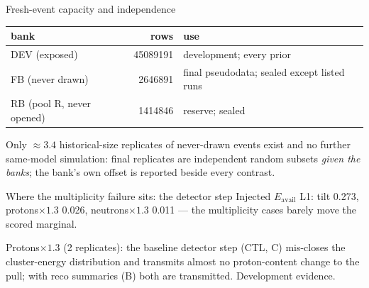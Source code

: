 \documentclass[aspectratio=169,10pt]{beamer}
\def\evidencetext{}
\begin{document}
\gdef\evidencetext{\texttt{banks/BANK\_MANIFEST.json}; \texttt{CAPACITY-20260925.md}}
\begin{frame}{Fresh-event capacity and independence}
{\small
\begin{tabular}{lrl}
\toprule
bank & rows & use \\
\midrule
DEV (exposed) & 45089191 & development; every prior \\
FB (never drawn) & 2646891 & final pseudodata; sealed except listed runs \\
RB (pool R, never opened) & 1414846 & reserve; sealed \\
\bottomrule
\end{tabular}}

\vspace{0.3cm}\small Only $\approx 3.4$ historical-size replicates of never-drawn events exist and no further
same-model simulation: final replicates are independent random subsets \emph{given the banks}; the bank's own
offset is reported beside every contrast.
\end{frame}

\gdef\evidencetext{\texttt{results/predecessor\_posthoc/}; \texttt{DIAGNOSTICS-20260925.md}}
\begin{frame}{Where the multiplicity failure sits: the detector step}
\small Injected $E_\mathrm{avail}$ L1: tilt 0.273, protons$\times1.3$ 0.026, neutrons$\times1.3$ 0.011 --- the multiplicity cases barely move the scored marginal.\par{}\par\vspace{0.2cm}\small Protons$\times1.3$ (2 replicates): the baseline detector step (CTL, C) mis-closes the cluster-energy distribution and transmits almost no proton-content change to the pull; with reco summaries (B) both are transmitted. Development evidence.
\end{frame}
\end{document}
